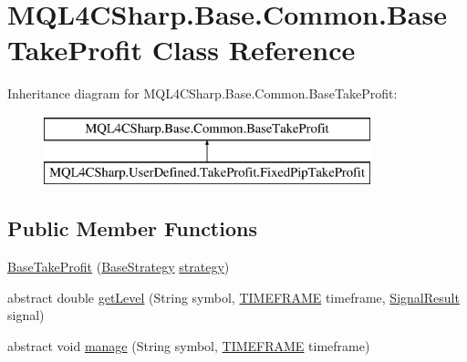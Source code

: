 \hypertarget{class_m_q_l4_c_sharp_1_1_base_1_1_common_1_1_base_take_profit}{}\section{M\+Q\+L4\+C\+Sharp.\+Base.\+Common.\+Base\+Take\+Profit Class Reference}
\label{class_m_q_l4_c_sharp_1_1_base_1_1_common_1_1_base_take_profit}
Inheritance diagram for M\+Q\+L4\+C\+Sharp.\+Base.\+Common.\+Base\+Take\+Profit\+:\begin{figure}[H]
\begin{center}
\leavevmode
\includegraphics[height=2.000000cm]{class_m_q_l4_c_sharp_1_1_base_1_1_common_1_1_base_take_profit}
\end{center}
\end{figure}
\subsection*{Public Member Functions}
\begin{DoxyCompactItemize}
\item 
\hyperlink{class_m_q_l4_c_sharp_1_1_base_1_1_common_1_1_base_take_profit_a98c9b420d66d738d2e55abbcb1ea3680}{Base\+Take\+Profit} (\hyperlink{class_m_q_l4_c_sharp_1_1_base_1_1_base_strategy}{Base\+Strategy} \hyperlink{class_m_q_l4_c_sharp_1_1_base_1_1_common_1_1_base_take_profit_a1846f084c91f056e7de1f8e41f7c6625}{strategy})
\item 
abstract double \hyperlink{class_m_q_l4_c_sharp_1_1_base_1_1_common_1_1_base_take_profit_aee90a0fff171cc0e14f989fe618efdae}{get\+Level} (String symbol, \hyperlink{namespace_m_q_l4_c_sharp_1_1_base_1_1_enums_a838810aaa87c63c12737408dba8c0b35}{T\+I\+M\+E\+F\+R\+A\+ME} timeframe, \hyperlink{class_m_q_l4_c_sharp_1_1_base_1_1_common_1_1_signal_result}{Signal\+Result} signal)
\item 
abstract void \hyperlink{class_m_q_l4_c_sharp_1_1_base_1_1_common_1_1_base_take_profit_a10176a6634bf9f2a3c849d2be013356c}{manage} (String symbol, \hyperlink{namespace_m_q_l4_c_sharp_1_1_base_1_1_enums_a838810aaa87c63c12737408dba8c0b35}{T\+I\+M\+E\+F\+R\+A\+ME} timeframe)
\end{DoxyCompactItemize}
